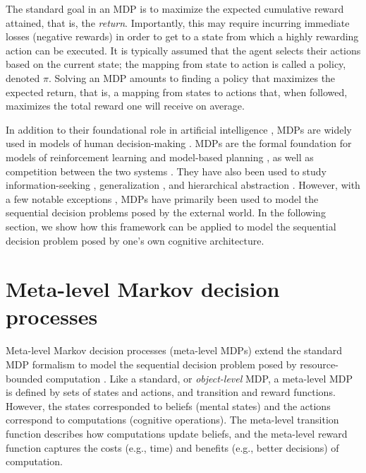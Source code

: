 The standard goal in an MDP is to maximize the expected cumulative reward attained, that is, the \emph{return}. Importantly, this may require incurring immediate losses (negative rewards) in order to get to a state from which a highly rewarding action can be executed. It is typically assumed that the agent selects their actions based on the current state; the mapping from state to action is called a policy, denoted $\pi$. Solving an MDP amounts to finding a policy that maximizes the expected return, that is, a mapping from states to actions that, when followed, maximizes the total reward one will receive on average.


In addition to their foundational role in artificial intelligence \citep{sutton2018reinforcement}, MDPs are widely used in models of human decision-making \citep{dayan2008decision}. MDPs are the formal foundation for models of reinforcement learning \citep{niv2009reinforcement} and model-based planning \citep{huys2015interplay,botvinick2012planning}, as well as competition between the two systems \citep{daw2005uncertaintybased,keramati2011speed,kool2017costbenefit}. They have also been used to study information-seeking \citep{gottlieb2013informationseeking,hunt2016approachinduced}, generalization \citep{tomov2021multitask}, and hierarchical abstraction \citep{solway2014optimal,botvinick2009hierarchically}. However, with a few notable exceptions \citep{dayan2008serotonin,drugowitsch2012cost,tajima2016optimal}, MDPs have primarily been used to model the sequential decision problems posed by the external world. In the following section, we show how this framework can be applied to model the sequential decision problem posed by one's own cognitive architecture.

\section{Meta-level Markov decision processes}


Meta-level Markov decision processes (meta-level MDPs) extend the standard MDP formalism to model the sequential decision problem posed by resource-bounded computation \citep{hay2012selecting}. Like a standard, or \emph{object-level} MDP, a meta-level MDP is defined by sets of states and actions, and transition and reward functions. However, the states corresponded to beliefs (mental states) and the actions correspond to computations (cognitive operations). The meta-level transition function describes how computations update beliefs, and the meta-level reward function captures the costs (e.g., time) and benefits (e.g., better decisions) of computation.

